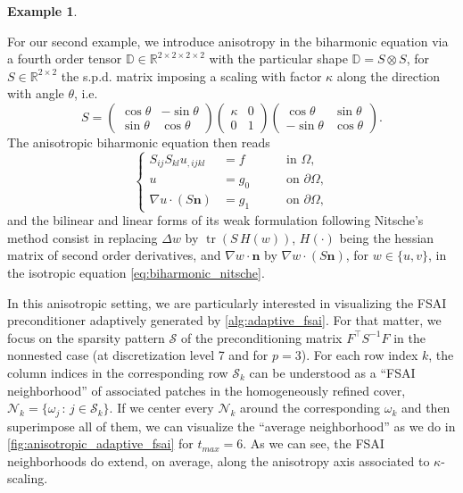 \documentclass[a4paper]{article}
\DeclareMathOperator{\trace}{tr}
\theoremstyle{plain}
\theoremstyle{definition}
\newtheorem{example}{Example}[section]
\theoremstyle{remark}
\begin{document}
\begin{example}\label{ex:anisotropic_biharmonic}

	For our second example, we introduce anisotropy in the biharmonic equation via a fourth order tensor \(\mathbb{D} \in \mathbb{R}^{2\times 2\times 2 \times 2}\) with the particular shape \(\mathbb{D} = S \otimes S\), for \(S\in \mathbb{R}^{2\times 2}\) the s.p.d. matrix imposing a scaling with factor \(\kappa\) along the direction with angle \(\theta\), i.e.
	\begin{equation*}
		S = \begin{pmatrix}
			\cos\theta & -\sin\theta \\ \sin\theta & \cos\theta
		\end{pmatrix} \begin{pmatrix}
			\kappa & 0 \\ 0 & 1
		\end{pmatrix} \begin{pmatrix}
		\cos\theta & \sin\theta \\ -\sin\theta & \cos\theta
		\end{pmatrix}.
	\end{equation*}
	The anisotropic biharmonic equation then reads
	\begin{equation*}
		\left\{
		\begin{aligned}
			S_{ij} S_{kl} u_{,ijkl} &= f \quad &&\text{ in } \Omega,\\
			u &= g_0 \quad &&\text{ on } \partial\Omega,\\
			\nabla u \cdot (S\mathbf{n}) &= g_1 \quad &&\text{ on } \partial\Omega,
		\end{aligned}
		\right.
	\end{equation*}
	and the bilinear and linear forms of its weak formulation following Nitsche's method consist in replacing \(\Delta w\) by \(\trace(S\, H(w))\), \(H(\cdot)\) being the hessian matrix of second order derivatives, and \(\nabla w \cdot \mathbf{n}\) by \(\nabla w \cdot (S\mathbf{n})\), for \(w \in \{u,v\}\), in the isotropic equation \cref{eq:biharmonic_nitsche}.

	In this anisotropic setting, we are particularly interested in visualizing the FSAI preconditioner adaptively generated by \cref{alg:adaptive_fsai}. For that matter, we focus on the sparsity pattern \(\mathcal{S}\) of the preconditioning matrix \(F^{\top} S^{-1} F\) in the nonnested case (at discretization level 7 and for \(p=3\)). For each row index \(k\), the column indices in the corresponding row \(\mathcal{S}_k\) can be understood as a ``FSAI neighborhood'' of associated patches in the homogeneously refined cover, \(\mathcal{N}_k = \{\omega_j \,\colon \, j\in \mathcal{S}_k\}\). If we center every \(\mathcal{N}_k\) around the corresponding \(\omega_k\) and then superimpose all of them, we can visualize the ``average neighborhood'' as we do in \cref{fig:anisotropic_adaptive_fsai} for \(t_{max} = 6\). As we can see, the FSAI neighborhoods do extend, on average, along the anisotropy axis associated to \(\kappa\)-scaling.


\end{example}
\end{document}
